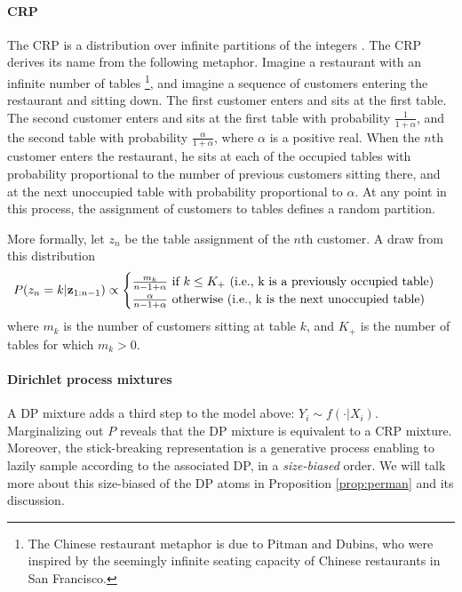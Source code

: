 \paragraph{\acrlong{CRP}}
The \gls{CRP} is a distribution over infinite partitions of the integers \cite{PitmanCRP,AldousCRP}.
The \gls{CRP} derives its name from the following metaphor. Imagine a restaurant with an infinite number of tables \footnote{The Chinese restaurant metaphor is due to Pitman and Dubins, who were inspired by the seemingly infinite seating capacity of Chinese restaurants in San Francisco.}, and imagine a sequence of customers entering the restaurant and sitting down. The first customer enters and sits at the first table. The second customer enters and sits at the first table with probability $\frac{1}{1+\alpha}$, and the second table with probability $\frac{\alpha}{1+\alpha}$, where $\alpha$ is a positive real. When the $n$th customer enters the restaurant, he sits at each of the occupied tables with probability proportional to the number of previous customers sitting there, and at the next unoccupied table with probability proportional to $\alpha$. At any point in this process, the assignment of customers to tables defines a random partition.

More formally, let $z_n$ be the table assignment of the $n$th customer. A draw from this distribution
\begin{equation*}
P(z_n = k | \mbz_{1:n-1})
\propto \begin{cases} \frac{m_k}{n-1+\alpha} \ \text{if} \ k \le K_+\ \text{(i.e., k is a previously occupied table)} \\ 
 \frac{\alpha}{n-1+\alpha} \ \text{otherwise} \ \text{(i.e., k is the next unoccupied table)} \end{cases}
\end{equation*}
where $m_k$ is the number of customers sitting at table $k$, and $K_+$ is the number of tables for which $m_k > 0$.

\paragraph{Dirichlet process mixtures}
A \gls{DP} mixture adds a third step to the model above: $Y_i \sim f(\cdot|X_i)$. Marginalizing out $P$ reveals that the \gls{DP} mixture is equivalent to a \gls{CRP} mixture. Moreover, the stick-breaking representation is a generative process enabling to lazily sample according to the associated \gls{DP}, in a \textit{size-biased} order. We will talk more about this size-biased of the \gls{DP} atoms in Proposition \ref{prop:perman} and its discussion.


